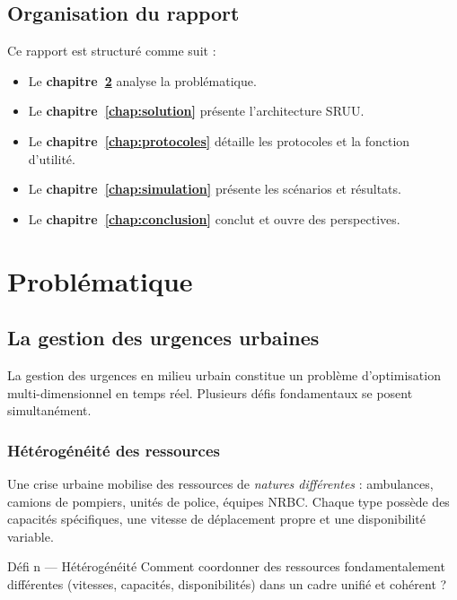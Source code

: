 \documentclass[12pt, a4paper]{report}
\begin{document}
\section{Organisation du rapport}

Ce rapport est structuré comme suit :
\begin{itemize}[noitemsep]
  \item Le \textbf{chapitre~\ref{chap:problematique}} analyse la problématique.
  \item Le \textbf{chapitre~\ref{chap:solution}} présente l'architecture SRUU.
  \item Le \textbf{chapitre~\ref{chap:protocoles}} détaille les protocoles et la fonction
    d'utilité.
  \item Le \textbf{chapitre~\ref{chap:simulation}} présente les scénarios et résultats.
  \item Le \textbf{chapitre~\ref{chap:conclusion}} conclut et ouvre des perspectives.
\end{itemize}

\chapter{Problématique}
\label{chap:problematique}

\section{La gestion des urgences urbaines}

La gestion des urgences en milieu urbain constitue un problème d'optimisation multi-dimen\-sionnel
en temps réel. Plusieurs défis fondamentaux se posent simultanément.

\subsection{Hétérogénéité des ressources}

Une crise urbaine mobilise des ressources de \emph{natures différentes} : ambulances,
camions de pompiers, unités de police, équipes NRBC. Chaque type possède des capacités
spécifiques, une vitesse de déplacement propre et une disponibilité variable.

\begin{alertbox}{Défi n — Hétérogénéité}
Comment coordonner des ressources fondamentalement différentes (vitesses, capacités,
disponibilités) dans un cadre unifié et cohérent ?
\end{alertbox}
\end{document}
